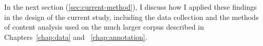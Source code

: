 In the next section (\ref{sec:current-method}), I discuss how I applied these findings in the design of the current study, including the data collection and the methods of content analysis used on the much larger corpus described in Chapters~\ref{chap:data} and ~\ref{chap:annotation}.

%
%


